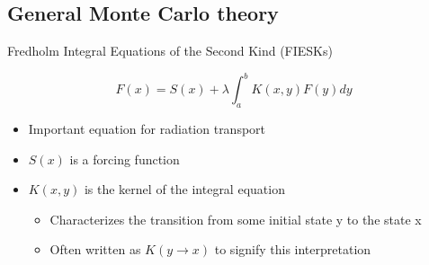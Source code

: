 \documentclass{beamer}
\begin{document}
\subsection{General Monte Carlo theory}
\begin{frame}{Fredholm Integral Equations of the Second Kind (FIESKs)}
  
  \begin{equation*}
    F(x) = S(x) + \lambda \int_a^b K(x,y) F(y)dy
  \end{equation*}

  \bigskip
  
  \begin{itemize}
    \item Important equation for radiation transport 
      \medskip
    \item $S(x)$ is a forcing function
      \medskip
    \item $K(x,y)$ is the kernel of the integral equation
      \begin{itemize}
        \smallskip
        \item Characterizes the transition from some initial state y to
          the state x
          \smallskip
        \item Often written as $K(y \to x)$ to signify this interpretation
      \end{itemize}
  \end{itemize}
  
\end{frame}
\end{document}
